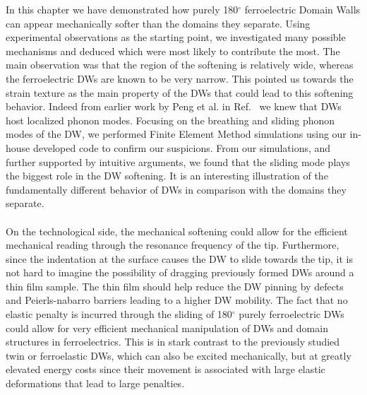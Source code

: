 In this chapter we have demonstrated how purely 180$^\circ$ ferroelectric Domain Walls can appear mechanically softer than the domains they separate.
Using experimental observations as the starting point, we investigated many possible mechanisms and deduced which were most likely to contribute the most.
The main observation was that the region of the softening is relatively wide, whereas the ferroelectric DWs are known to be very narrow.
This pointed us towards the strain texture as the main property of the DWs that could lead to this softening behavior.
Indeed from earlier work by Peng et al. in Ref.~\cite{Chen2020} we knew that DWs host localized phonon modes.
Focusing on the breathing and sliding phonon modes of the DW, we performed Finite Element Method simulations using our in-house developed code to confirm our suspicions.
From our simulations, and further supported by intuitive arguments, we found that the sliding mode plays the biggest role in the DW softening.
It is an interesting illustration of the fundamentally different behavior of DWs in comparison with the domains they separate.
\\\\
On the technological side, the mechanical softening could allow for the efficient mechanical reading through the resonance frequency of the tip.
Furthermore, since the indentation at the surface causes the DW to slide towards the tip, it is not hard to imagine the possibility of dragging previously formed DWs around a thin film sample.
The thin film should help reduce the DW pinning by defects and Peierls-nabarro barriers leading to a higher DW mobility.
The fact that no elastic penalty is incurred through the sliding of 180$^\circ$ purely ferroelectric DWs could allow for very efficient mechanical manipulation of DWs and domain structures in ferroelectrics.
This is in stark contrast to the previously studied twin or ferroelastic DWs, which can also be excited mechanically, but at greatly elevated energy costs since their movement is associated with large elastic deformations that lead to large penalties.
